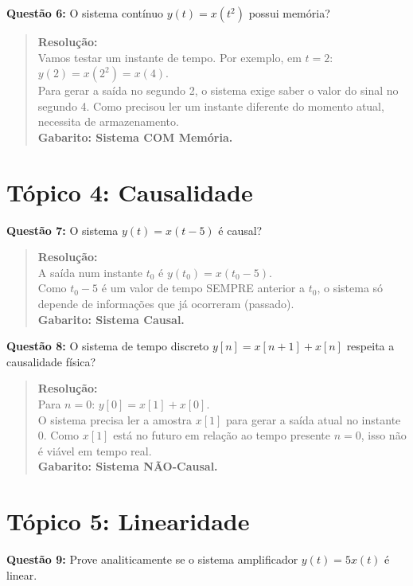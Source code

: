 \textbf{Questão 6:} O sistema contínuo \(y(t) = x(t^2)\) possui memória?

\begin{quote}
\textbf{Resolução:}\\
Vamos testar um instante de tempo. Por exemplo, em \(t = 2\):\\
\(y(2) = x(2^2) = x(4)\).\\
Para gerar a saída no segundo 2, o sistema exige saber o valor do sinal no segundo 4. Como precisou ler um instante diferente do momento atual, necessita de armazenamento.\\
\textbf{Gabarito: Sistema COM Memória.}
\end{quote}

\section{Tópico 4: Causalidade}\label{tuxf3pico-4-causalidade}

\textbf{Questão 7:} O sistema \(y(t) = x(t-5)\) é causal?

\begin{quote}
\textbf{Resolução:}\\
A saída num instante \(t_0\) é \(y(t_0) = x(t_0 - 5)\).\\
Como \(t_0 - 5\) é um valor de tempo SEMPRE anterior a \(t_0\), o sistema só depende de informações que já ocorreram (passado).\\
\textbf{Gabarito: Sistema Causal.}
\end{quote}

\textbf{Questão 8:} O sistema de tempo discreto \(y[n] = x[n+1] + x[n]\) respeita a causalidade física?

\begin{quote}
\textbf{Resolução:}\\
Para \(n=0\): \(y[0] = x[1] + x[0]\).\\
O sistema precisa ler a amostra \(x[1]\) para gerar a saída atual no instante 0. Como \(x[1]\) está no futuro em relação ao tempo presente \(n=0\), isso não é viável em tempo real.\\
\textbf{Gabarito: Sistema NÃO-Causal.}
\end{quote}

\section{Tópico 5: Linearidade}\label{tuxf3pico-5-linearidade}

\textbf{Questão 9:} Prove analiticamente se o sistema amplificador \(y(t) = 5x(t)\) é linear.

